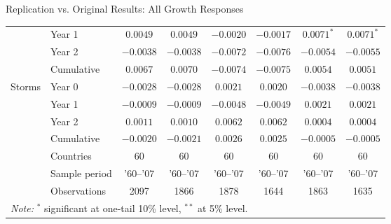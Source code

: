 \documentclass[10pt, aspectratio=169]{beamer}
\begin{document}
\begin{frame}{Replication vs. Original Results: All Growth Responses}
\begin{table}
{\begin{tabular}{llcccccc}
                        & Year 1            & $0.0049$       & $0.0049$       & $-0.0020$      & $-0.0017$      & $0.0071^{*}$   & $0.0071^{*}$ \\
                        & Year 2            & $-0.0038$      & $-0.0038$      & $-0.0072$      & $-0.0076$      & $-0.0054$      & $-0.0055$ \\
                        & Cumulative        & $0.0067$       & $0.0070$       & $-0.0074$      & $-0.0075$      & $0.0054$       & $0.0051$ \\
            [0.5ex]
            Storms      & Year 0            & $-0.0028$      & $-0.0028$      & $0.0021$       & $0.0020$       & $-0.0038$      & $-0.0038$ \\
                        & Year 1            & $-0.0009$      & $-0.0009$      & $-0.0048$      & $-0.0049$      & $0.0021$       & $0.0021$ \\
                        & Year 2            & $0.0011$       & $0.0010$       & $0.0062$       & $0.0062$       & $0.0004$       & $0.0004$ \\
                        & Cumulative        & $-0.0020$      & $-0.0021$      & $0.0026$       & $0.0025$       & $-0.0005$      & $-0.0005$ \\
            \midrule
                        & Countries         & 60         & 60         & 60         & 60         & 60         & 60 \\
                        & Sample period     & '60--'07   & '60--'07   & '60--'07   & '60--'07   & '60--'07   & '60--'07 \\
                        & Observations      & 2097       & 1866       & 1878       & 1644       & 1863       & 1635 \\
            \bottomrule
            \multicolumn{8}{l}{\scriptsize \textit{Note:} $^{*}$ significant at one-tail 10\% level, $^{**}$ at 5\% level.}
        \end{tabular}
        }
    \end{table}
\end{frame}
\end{document}
